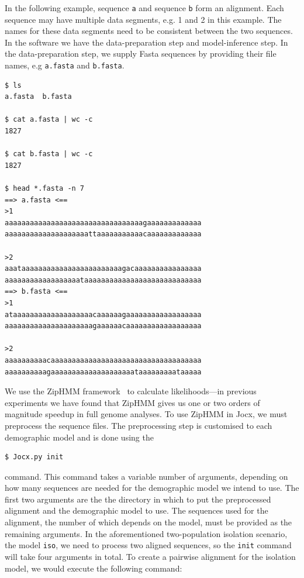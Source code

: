 \documentclass[graybox]{svmult}
\begin{document}

In the following example, sequence \texttt{a} and sequence \texttt{b} form an alignment.  Each sequence may have multiple data segments, e.g. 1 and 2 in this example.  The names for these data segments need to be consistent between the two sequences.  In the software we have the data-preparation step and model-inference step.  In the data-preparation step, we supply Fasta sequences by providing their file names, e.g \texttt{a.fasta} and \texttt{b.fasta}.

 {\scriptsize{}\begin{verbatim}
$ ls
a.fasta  b.fasta

$ cat a.fasta | wc -c
1827

$ cat b.fasta | wc -c
1827

$ head *.fasta -n 7
==> a.fasta <==
>1
aaaaaaaaaaaaaaaaaaaaaaaaaaaaaaaaagaaaaaaaaaaaaa
aaaaaaaaaaaaaaaaaaaattaaaaaaaaaaacaaaaaaaaaaaaa

>2
aaataaaaaaaaaaaaaaaaaaaaaaaagacaaaaaaaaaaaaaaaa
aaaaaaaaaaaaaaaaaataaaaaaaaaaaaaaaaaaaaaaaaaaaa
==> b.fasta <==
>1
ataaaaaaaaaaaaaaaaaaacaaaaaagaaaaaaaaaaaaaaaaaa
aaaaaaaaaaaaaaaaaaaaagaaaaaacaaaaaaaaaaaaaaaaaa

>2
aaaaaaaaaacaaaaaaaaaaaaaaaaaaaaaaaaaaaaaaaaaaaa
aaaaaaaaaagaaaaaaaaaaaaaaaaaaaataaaaaaaaataaaaa
\end{verbatim}}


We use the ZipHMM framework~\cite{Sand:2013bia} to calculate likelihoods---in previous experiments we have found that ZipHMM gives us one or two orders of magnitude speedup in full genome analyses. To use ZipHMM in Jocx, we must preprocess the sequence files. The preprocessing step is customised to each demographic model and is done using the
 {\scriptsize{}\begin{verbatim}
$ Jocx.py init
\end{verbatim}}
\noindent
command. This command takes a variable number of arguments, depending on how many sequences are needed for the demographic model we intend to use. The first two arguments are the the directory in which to put the preprocessed alignment and the demographic model to use. The sequences used for the alignment, the number of which depends on the model, must be provided as the remaining arguments. In the aforementioned two-population isolation scenario, the model \texttt{iso}, we need to process two aligned sequences, so the \texttt{init} command will take four arguments in total. To create a pairwise alignment for the isolation model, we would execute the following command:
\end{document}
